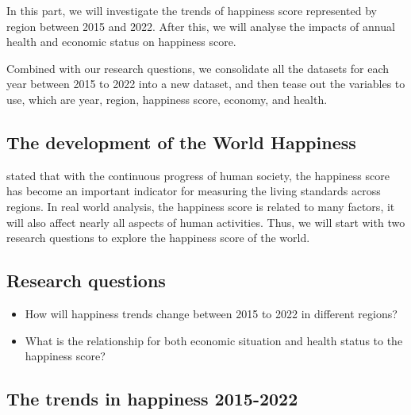 \documentclass[11pt,a4paper,]{article}
\begin{document}
In this part, we will investigate the trends of happiness score represented by region between 2015 and 2022. After this, we will analyse the impacts of annual health and economic status on happiness score.

Combined with our research questions, we consolidate all the datasets for each year between 2015 to 2022 into a new dataset, and then tease out the variables to use, which are year, region, happiness score, economy, and health.

\hypertarget{the-development-of-the-world-happiness}{%
\subsection{The development of the World Happiness}\label{the-development-of-the-world-happiness}}

\textcite{helliwell2012state} stated that with the continuous progress of human society, the happiness score has become an important indicator for measuring the living standards across regions. In real world analysis, the happiness score is related to many factors, it will also affect nearly all aspects of human activities. Thus, we will start with two research questions to explore the happiness score of the world.

\hypertarget{research-questions-1}{%
\subsection{Research questions}\label{research-questions-1}}

\begin{itemize}
\item
  How will happiness trends change between 2015 to 2022 in different regions?
\item
  What is the relationship for both economic situation and health status to the happiness score?
\end{itemize}

\hypertarget{the-trends-in-happiness-2015-2022}{%
\subsection{The trends in happiness 2015-2022}\label{the-trends-in-happiness-2015-2022}}
\end{document}
